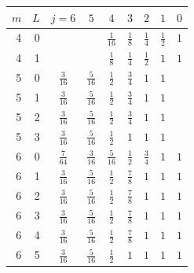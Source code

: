 \begin{tabular}{rrccccccc}
\toprule
$m$ & $L$ & $j=6$ & $5$ & $4$ & $3$ & $2$ & $1$ & $0$\\
\midrule
4 & 0 &  &  & $\tfrac{1}{16}$ & $\tfrac{1}{8}$ & $\tfrac{1}{4}$ & $\tfrac{1}{2}$ & $1$\\
4 & 1 &  &  & $\tfrac{1}{8}$ & $\tfrac{1}{4}$ & $\tfrac{1}{2}$ & $1$ & $1$\\
5 & 0 & $\tfrac{3}{16}$ & $\tfrac{5}{16}$ & $\tfrac{1}{2}$ & $\tfrac{3}{4}$ & $1$ & $1$\\
5 & 1 & $\tfrac{3}{16}$ & $\tfrac{5}{16}$ & $\tfrac{1}{2}$ & $\tfrac{3}{4}$ & $1$ & $1$\\
5 & 2 & $\tfrac{3}{16}$ & $\tfrac{5}{16}$ & $\tfrac{1}{2}$ & $\tfrac{3}{4}$ & $1$ & $1$\\
5 & 3 & $\tfrac{3}{16}$ & $\tfrac{5}{16}$ & $\tfrac{1}{2}$ & $1$ & $1$ & $1$\\
6 & 0 & $\tfrac{7}{64}$ & $\tfrac{3}{16}$ & $\tfrac{5}{16}$ & $\tfrac{1}{2}$ & $\tfrac{3}{4}$ & $1$ & $1$\\
6 & 1 & $\tfrac{3}{16}$ & $\tfrac{5}{16}$ & $\tfrac{1}{2}$ & $\tfrac{7}{8}$ & $1$ & $1$ & $1$\\
6 & 2 & $\tfrac{3}{16}$ & $\tfrac{5}{16}$ & $\tfrac{1}{2}$ & $\tfrac{7}{8}$ & $1$ & $1$ & $1$\\
6 & 3 & $\tfrac{3}{16}$ & $\tfrac{5}{16}$ & $\tfrac{1}{2}$ & $\tfrac{7}{8}$ & $1$ & $1$ & $1$\\
6 & 4 & $\tfrac{3}{16}$ & $\tfrac{5}{16}$ & $\tfrac{1}{2}$ & $\tfrac{7}{8}$ & $1$ & $1$ & $1$\\
6 & 5 & $\tfrac{3}{16}$ & $\tfrac{5}{16}$ & $\tfrac{1}{2}$ & $1$ & $1$ & $1$ & $1$\\
\bottomrule
\end{tabular}
